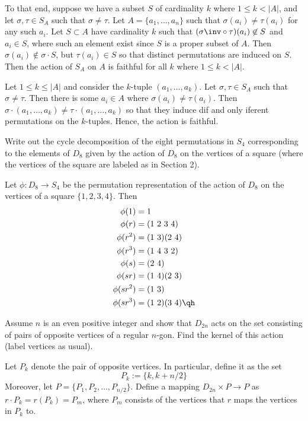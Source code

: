 \begin{problems}
\begin{solalph}
        To that end, suppose we have a subset $S$ of cardinality $k$ where $1 \leq k < |A|$, and let $\sigma, \tau \in S_A$ such that $\sigma \neq \tau$. Let $A = \{a_1, \ldots, a_n\}$ such that $\sigma(a_i) \neq \tau(a_i)$ for any such $a_i$. Let $S \subset A$ have cardinality $k$ such that $(\sigma\inv \circ \tau)(a_i) \not\in S$ and $a_i \in S$, where such an element exist since $S$ is a proper subset of $A$. Then $\sigma(a_i) \not\in \sigma \cdot S$, but $\tau(a_i) \in S$ so that distinct permutations are induced on $S$. Then the action of $S_A$ on $A$ is faithful for all $k$ where $1 \leq k < |A|$. 
        \item Let $1 \leq k \leq |A|$ and consider the $k$-tuple $(a_1, \ldots, a_k)$. Let $\sigma, \tau \in S_A$ such that $\sigma \neq \tau$. Then there is some $a_i \in A$ where $\sigma(a_i) \neq \tau(a_i)$. Then $\sigma \cdot (a_1, \ldots, a_k) \neq \tau \cdot (a_1, \ldots, a_k)$ so that they induce dif and only iferent permutations on the $k$-tuples. Hence, the action is faithful.
    \end{solalph}
    \item Write out the cycle decomposition of the eight permutations in $S_4$ corresponding to the elements of $D_8$ given by the action of $D_8$ on the vertices of a square (where the vertices of the square are labeled as in Section 2).
    \begin{sol}
        Let $\phi : D_8 \to S_4$ be the permutation representation of the action of $D_8$ on the vertices of a square $\{1, 2, 3, 4\}$. Then
        \begin{align*}
            \phi(1) & = 1 \\
            \phi(r) & = (1\ 2\ 3\ 4) \\
            \phi(r^2) & = (1\ 3)(2\ 4) \\
            \phi(r^3) & = (1\ 4\ 3\ 2) \\
            \phi(s) & = (2\ 4) \\
            \phi(sr) & = (1\ 4)(2\ 3) \\
            \phi(sr^2) & = (1\ 3) \\
            \phi(sr^3) & = (1\ 2)(3\ 4) \qh
        \end{align*}
    \end{sol}
    \item Assume $n$ is an even positive integer and show that $D_{2n}$ acts on the set consisting of pairs of opposite vertices of a regular $n$-gon. Find the kernel of this action (label vertices as usual).
    \label{ex1.7.12}
    \begin{sol}
        Let $P_k$ denote the pair of opposite vertices. In particular, define it as the set
        \[P_k := \{k, k + n/2\}\]
        Moreover, let $P = \{P_1, P_2, \ldots, P_{n/2}\}$. Define a mapping $D_{2n} \times P \to P$ as $r \cdot P_k = r(P_k) = P_m$, where $P_m$ consists of the vertices that $r$ maps the vertices in $P_k$ to.
        

\end{sol}
\end{problems}
